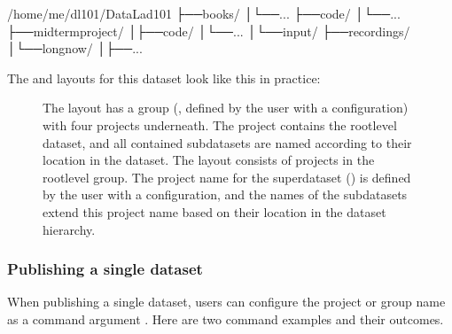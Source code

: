 \begin{sphinxVerbatim}[commandchars=\\\{\}]
/home/me/dl\PYGZhy{}101/DataLad\PYGZhy{}101
├──books/
│└──\PYG{o}{[}...\PYG{o}{]}
├──code/
│└──\PYG{o}{[}...\PYG{o}{]}
├──midterm\PYGZus{}project/
│├──code/
│└──\PYG{o}{[}...\PYG{o}{]}
│└──input/
├──recordings/
│└──longnow/
│├──\PYG{o}{[}...\PYG{o}{]}
\end{sphinxVerbatim}

\sphinxAtStartPar
The  and  layouts for this dataset look like this in practice:

\begin{figure}[tbp]
\centering
\capstart

\noindent{}
\caption{The  layout has a group (, defined by the user with a configuration) with four projects underneath. The  project contains the root\sphinxhyphen{}level dataset, and all contained subdatasets are named according to their location in the dataset. The  layout consists of projects in the root\sphinxhyphen{}level group. The project name for the superdataset () is defined by the user with a configuration, and the names of the subdatasets extend this project name based on their location in the dataset hierarchy.}\label{\detokenize{basics/101-139-hostingservices:id12}}\end{figure}


\subsubsection{Publishing a single dataset}
\label{\detokenize{basics/101-139-hostingservices:publishing-a-single-dataset}}
\sphinxAtStartPar
When publishing a single dataset, users can configure the project or group name as a command argument .
Here are two command examples and their outcomes.


